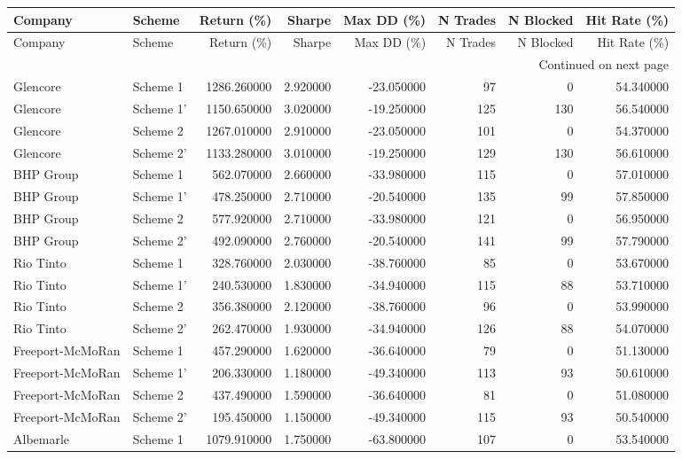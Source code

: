 \begin{longtable}{llrrrrrr}
\toprule
Company & Scheme & Return (\%) & Sharpe & Max DD (\%) & N Trades & N Blocked & Hit Rate (\%) \\
\midrule
\endfirsthead
\toprule
Company & Scheme & Return (\%) & Sharpe & Max DD (\%) & N Trades & N Blocked & Hit Rate (\%) \\
\midrule
\endhead
\midrule
\multicolumn{8}{r}{Continued on next page} \\
\midrule
\endfoot
\bottomrule
\endlastfoot
Glencore & Scheme 1 & 1286.260000 & 2.920000 & -23.050000 & 97 & 0 & 54.340000 \\
Glencore & Scheme 1' & 1150.650000 & 3.020000 & -19.250000 & 125 & 130 & 56.540000 \\
Glencore & Scheme 2 & 1267.010000 & 2.910000 & -23.050000 & 101 & 0 & 54.370000 \\
Glencore & Scheme 2' & 1133.280000 & 3.010000 & -19.250000 & 129 & 130 & 56.610000 \\
BHP Group & Scheme 1 & 562.070000 & 2.660000 & -33.980000 & 115 & 0 & 57.010000 \\
BHP Group & Scheme 1' & 478.250000 & 2.710000 & -20.540000 & 135 & 99 & 57.850000 \\
BHP Group & Scheme 2 & 577.920000 & 2.710000 & -33.980000 & 121 & 0 & 56.950000 \\
BHP Group & Scheme 2' & 492.090000 & 2.760000 & -20.540000 & 141 & 99 & 57.790000 \\
Rio Tinto & Scheme 1 & 328.760000 & 2.030000 & -38.760000 & 85 & 0 & 53.670000 \\
Rio Tinto & Scheme 1' & 240.530000 & 1.830000 & -34.940000 & 115 & 88 & 53.710000 \\
Rio Tinto & Scheme 2 & 356.380000 & 2.120000 & -38.760000 & 96 & 0 & 53.990000 \\
Rio Tinto & Scheme 2' & 262.470000 & 1.930000 & -34.940000 & 126 & 88 & 54.070000 \\
Freeport-McMoRan & Scheme 1 & 457.290000 & 1.620000 & -36.640000 & 79 & 0 & 51.130000 \\
Freeport-McMoRan & Scheme 1' & 206.330000 & 1.180000 & -49.340000 & 113 & 93 & 50.610000 \\
Freeport-McMoRan & Scheme 2 & 437.490000 & 1.590000 & -36.640000 & 81 & 0 & 51.080000 \\
Freeport-McMoRan & Scheme 2' & 195.450000 & 1.150000 & -49.340000 & 115 & 93 & 50.540000 \\
Albemarle & Scheme 1 & 1079.910000 & 1.750000 & -63.800000 & 107 & 0 & 53.540000 \\

\end{longtable}
